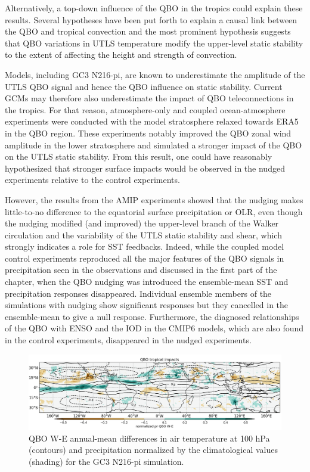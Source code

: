 Alternatively, a top-down influence of the QBO in the tropics could explain these results. Several hypotheses have been put forth to explain a causal link between the QBO and tropical convection  \citep{hitchman2021observational,haynes2021influence}
and the most prominent hypothesis suggests that QBO variations in UTLS temperature modify the upper-level static stability to the extent of affecting the height and strength of convection.  


Models, including GC3 N216-pi, are known to underestimate the amplitude of the UTLS QBO signal and hence the QBO influence on static stability. Current GCMs may therefore 
also underestimate the impact of QBO teleconnections in the tropics. 
For that reason, atmosphere-only and coupled ocean-atmosphere experiments were 
conducted with the model stratosphere relaxed towards ERA5 in the QBO region. These 
experiments notably improved the QBO zonal wind amplitude in the lower stratosphere and simulated a stronger impact of the QBO on the UTLS static stability. From this result, one could have reasonably hypothesized that stronger surface impacts would be observed in the nudged experiments relative to the control experiments. 

However, the results from the AMIP experiments showed that the nudging makes little-to-no difference to the equatorial surface precipitation or OLR, even though the nudging modified (and improved) the upper-level branch of the Walker circulation and the variability of the UTLS static stability and shear, which strongly indicates a role for SST feedbacks. Indeed, while the coupled model control experiments reproduced all the major features of the QBO signals in precipitation seen in the observations and discussed in the first part of the chapter, when the QBO nudging was introduced the ensemble-mean SST and precipitation responses disappeared. Individual ensemble members of the simulations with nudging show significant responses but they cancelled in the ensemble-mean to give a null response. Furthermore, the diagnosed relationships of the QBO with ENSO and the IOD in the CMIP6 models, which are also found in the control experiments, disappeared in the nudged experiments.  


\begin{figure}[t!]
\centering
 \noindent
 \includegraphics[width=\linewidth]{figures/finalfig.png}
\caption[Precipitation and 100 hPa temperature differences ]{QBO W-E annual-mean differences in air temperature at 100 hPa (contours) and precipitation normalized by the climatological values (shading) for the GC3 N216-pi simulation. }
\label{fig:qbo_mechanisms}
\end{figure}

